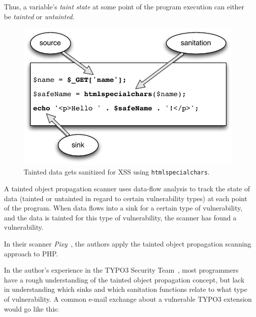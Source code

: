 Thus, a variable's \emph{taint state}\label{taint-state} at some point of the program execution can either be \emph{tainted} or \emph{untainted}.

\begin{figure}[htb]
  \begin{center}
    \includegraphics[scale=0.75]{images/taint-and-clean}
    \caption{Tainted data gets sanitized for XSS using \texttt{htmlspecialchars}.}
    \label{fig:taint-and-clean}
  \end{center}
\end{figure}

A tainted object propagation scanner uses data-flow analysis to track the state of data (tainted or untainted in regard to certain vulnerability types) at each point of the program. When data flows into a sink for a certain type of vulnerability, and the data is tainted for this type of vulnerability, the scanner has found a vulnerability.

In their scanner \emph{Pixy}~\cite{pixy-short, pixy-long, pixy-dissertation}, the authors apply the tainted object propagation scanning approach to PHP.

In the author's experience in the TYPO3 Security Team~\cite{security-team-members}, most programmers have a rough understanding of the tainted object  propagation concept, but lack in understanding which sinks and which sanitation functions relate to what type of vulnerability. A common e-mail exchange about a vulnerable TYPO3 extension would go like this:

